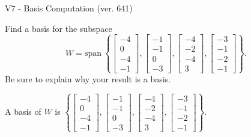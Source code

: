 \begin{exercise}
  \begin{exerciseTitle}V7 - Basis Computation (ver. 641)\end{exerciseTitle}
  \begin{exerciseStatement}
    Find a basis for the subspace 
\[W=\mathrm{span}\ \left\{\left[\begin{array}{r}
-4 \\
0 \\
-4 \\
-1
\end{array}\right] , \left[\begin{array}{r}
-1 \\
-1 \\
0 \\
-3
\end{array}\right] , \left[\begin{array}{r}
-4 \\
-2 \\
-4 \\
3
\end{array}\right] , \left[\begin{array}{r}
-3 \\
-1 \\
-2 \\
-1
\end{array}\right]\right\}.\]
 Be sure to explain why your result is a basis.


  \end{exerciseStatement}
  \begin{exerciseAnswer}
   A basis of \(W\) is  \(\left\{\left[\begin{array}{r}
-4 \\
0 \\
-4 \\
-1
\end{array}\right] , \left[\begin{array}{r}
-1 \\
-1 \\
0 \\
-3
\end{array}\right] , \left[\begin{array}{r}
-4 \\
-2 \\
-4 \\
3
\end{array}\right] , \left[\begin{array}{r}
-3 \\
-1 \\
-2 \\
-1
\end{array}\right]\right\}\).
  


  \end{exerciseAnswer}
\end{exercise}